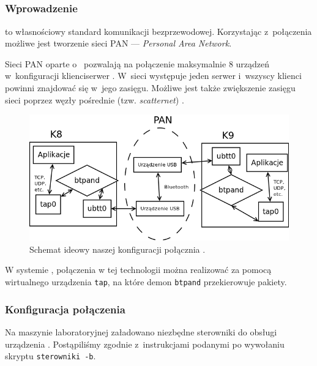 \subsection{\bt}
\label{sec:bt}

\subsubsection{Wprowadzenie}

\bt{} to własnościowy standard komunikacji bezprzewodowej. Korzystając
z~połączenia \bt{} możliwe jest tworzenie sieci PAN --- \emph{Personal Area
Network}.

Sieci PAN oparte o~\bt{} pozwalają na połączenie maksymalnie 8 urządzeń
w~konfiguracji klienci\dywiz serwer \cite{wiki:pan}. W~sieci występuje jeden
serwer i~wszyscy klienci powinni znajdować się w~jego zasięgu. Możliwe jest
także zwiększenie zasięgu sieci poprzez węzły pośrednie (tzw.
\emph{scatternet}) \cite{bt}.

\begin{figure}[h!]
  \centering
  \includegraphics[width=\textwidth]{figury/bluetooth/schemat.png}
  \caption{Schemat ideowy naszej konfiguracji połącznia \bt.}
\end{figure}

W systemie \bsd, połączenia w tej technologii można realizować za pomocą
wirtualnego urządzenia \texttt{tap}, na które demon \texttt{btpand}
przekierowuje pakiety.

\subsubsection{Konfiguracja połączenia}

Na maszynie laboratoryjnej załadowano niezbędne sterowniki do obsługi
urządzenia \bt. Postąpiliśmy zgodnie z~instrukcjami podanymi po wywołaniu
skryptu \texttt{sterowniki -b}.

